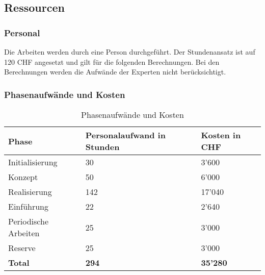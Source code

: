 \subsection{Ressourcen}

\subsubsection{Personal}
Die Arbeiten werden durch eine Person durchgeführt. Der Stundenansatz ist auf 120 CHF angesetzt und gilt für die folgenden Berechnungen. Bei den Berechnungen werden die Aufwände der Experten nicht berücksichtigt.


\subsubsection{Phasenaufwände und Kosten}

\begin{table}[H]
\centering
\begin{tabular}[t]{p{4cm}p{4cm}p{4cm}}
\hline
\rowcolor{heading}\textbf{Phase} & \textbf{Personalaufwand \newline in Stunden} & \textbf{ Kosten \newline in CHF} \\\hline
Initialisierung & 30 & 3'600 \\\hline
Konzept & 50 & 6'000 \\\hline
Realisierung & 142 & 17'040 \\\hline
Einführung & 22 & 2'640 \\\hline 
Periodische Arbeiten & 25 & 3'000 \\\hline
Reserve & 25 & 3'000 \\\hline
\textbf{Total} & \textbf{294} & \textbf{35'280}  \\\hline
\end{tabular}
\caption{Phasenaufwände und Kosten}
\end{table}

